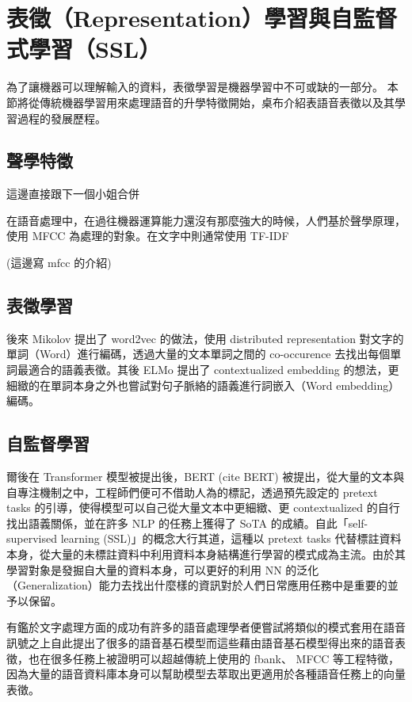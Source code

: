 \section{表徵（Representation）學習與自監督式學習（SSL）}

為了讓機器可以理解輸入的資料，表徵學習是機器學習中不可或缺的一部分。
本節將從傳統機器學習用來處理語音的升學特徵開始，桌布介紹表語音表徵以及其學習過程的發展歷程。

\subsection{聲學特徵} 這邊直接跟下一個小姐合併



在語音處理中，在過往機器運算能力還沒有那麼強大的時候，人們基於聲學原理，使用 MFCC 為處理的對象。在文字中則通常使用 TF-IDF

(這邊寫 mfcc 的介紹)

\subsection{表徵學習}

後來 Mikolov 提出了 word2vec 的做法，使用 distributed representation 對文字的單詞（Word）進行編碼，透過大量的文本單詞之間的 co-occurence 去找出每個單詞最適合的語義表徵。其後 ELMo 提出了 contextualized embedding 的想法，更細緻的在單詞本身之外也嘗試對句子脈絡的語義進行詞嵌入（Word embedding）編碼。

\subsection{自監督學習}

爾後在 Transformer 模型被提出後，BERT (cite BERT) 被提出，從大量的文本與自專注機制之中，工程師們便可不借助人為的標記，透過預先設定的 pretext tasks 的引導，使得模型可以自己從大量文本中更細緻、更 contextualized 的自行找出語義關係，並在許多 NLP 的任務上獲得了 SoTA 的成績。自此「self-supervised learning (SSL)」的概念大行其道，這種以 pretext tasks 代替標註資料本身，從大量的未標註資料中利用資料本身結構進行學習的模式成為主流。由於其學習對象是發掘自大量的資料本身，可以更好的利用 NN 的泛化（Generalization）能力去找出什麼樣的資訊對於人們日常應用任務中是重要的並予以保留。

有鑑於文字處理方面的成功有許多的語音處理學者便嘗試將類似的模式套用在語音訊號之上自此提出了很多的語音基石模型而這些藉由語音基石模型得出來的語音表徵，也在很多任務上被證明可以超越傳統上使用的 fbank、 MFCC 等工程特徵，因為大量的語音資料庫本身可以幫助模型去萃取出更適用於各種語音任務上的向量表徵。

